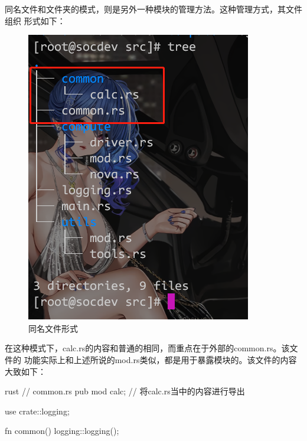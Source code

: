 同名文件和文件夹的模式，则是另外一种模块的管理方法。这种管理方式，其文件组织
形式如下：
\begin{figure}[H]
  \centering
  \includegraphics[scale=0.3]{rust_mod_file.png}
  \caption{同名文件形式}
  \label{fig:rust_mod_file}
\end{figure}
在这种模式下，calc.rs的内容和普通的相同，而重点在于外部的common.rs。该文件的
功能实际上和上述所说的mod.rs类似，都是用于暴露模块的。该文件的内容大致如下：
\begin{code-block}{rust}
// common.rs
pub mod calc; // 将calc.rs当中的内容进行导出

use crate::logging;

fn common() {
    logging::logging();
}
\end{code-block}

